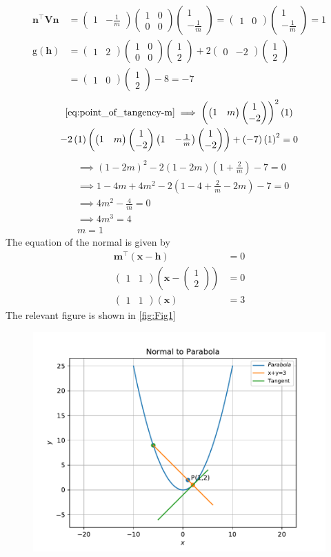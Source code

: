 \documentclass[12pt]{article}
\providecommand{\brak}[1]{\ensuremath{\left(#1\right)}}
\newcommand{\myvec}[1]{\ensuremath{\begin{pmatrix}#1\end{pmatrix}}}
\let\vec\mathbf
\begin{document}
\begin{enumerate}
\begin{align}
	\vec{n}^\top\vec{V}\vec{n} &= \myvec{1 & -\frac{1}{m}}\myvec{1 & 0 \\ 0 & 0}\myvec{1  \\ -\frac{1}{m}}=\myvec{1 & 0}\myvec{1  \\ -\frac{1}{m}} = 1 \\
	\text{g}\brak{\vec{h}} &= \myvec{1 & 2}\myvec{1 & 0 \\ 0 & 0}\myvec{ 1\\ 2} + 2\myvec{0 & -2}\myvec{1 \\ 2} \\
	&= \myvec{1 & 0}\myvec{1 \\2}-8 = -7 
\end{align}
\begin{multline}
	\eqref{eq:point_of_tangency-m}\implies
	\brak{\myvec{1 & m}\myvec{1 \\ -2}}^2\brak{1} \\ 
	- 2\brak{1}\brak{\myvec{1 & m}\myvec{1 \\ -2}\myvec{1 & -\frac{1}{m}}\myvec{1 \\ -2}} 
	+ \brak{-7}\brak{1}^2 = 0
\end{multline}
\begin{align}
	&\implies \brak{1-2m}^2 -2\brak{1-2m}\brak{1+\frac{2}{m}} -7 = 0 \\ 
	&\implies 1-4m+4m^2 -2\brak{1-4+\frac{2}{m}-2m}-7 = 0 \\
        &\implies 4m^2 - \frac{4}{m} = 0 \\
	&\implies 4m^3 = 4 \\
	& m = 1
\end{align}
The equation of the normal is given by
\begin{align}
	\vec{m}^\top\brak{\vec{x}-\vec{h}} &= 0 \\
	\myvec{1 & 1}\brak{\vec{x}-\myvec{1 \\ 2}} &= 0 \\
	\myvec{1 & 1}\brak{\vec{x}} &= 3 
\end{align}
The relevant figure is shown in \ref{fig:Fig1}
\begin{figure}[!h]
	\begin{center}
		\includegraphics[width=\columnwidth]{figs/problem23.pdf}

\end{center}
\end{figure}
\end{enumerate}
\end{document}
